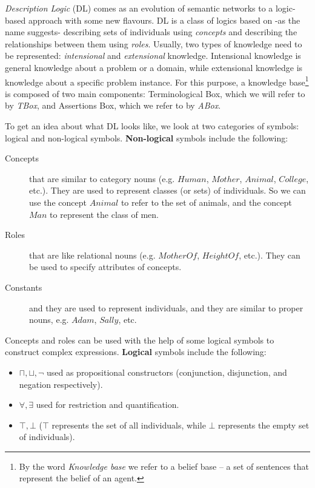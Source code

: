 \textit{Description Logic} (DL) comes as an evolution of semantic networks to a logic-based approach with some new flavours. DL is a class of logics based on -as the name suggests- describing sets of individuals using \textit{concepts} and describing the relationships between them using \textit{roles}. Usually, two types of knowledge need to be represented: \textit{intensional} and \textit{extensional} knowledge. Intensional knowledge is general knowledge about a problem or a domain, while extensional knowledge is knowledge about a specific problem instance. For this purpose, a knowledge base\footnote{By the word \textit{Knowledge base} we refer to a belief base -- a set of sentences that represent the belief of an agent.} is composed of two main components: Terminological Box, which we will refer to by \textit{TBox}, and Assertions Box, which we refer to by \textit{ABox}.

To get an idea about what DL looks like, we look at two categories of symbols: logical and non-logical symbols. \textbf{Non-logical} symbols include the following:
\begin{description}
\item[Concepts] that are similar to category nouns (e.g. $Human$, $Mother$, $Animal$, $College$, etc.). They are used to represent classes (or sets) of individuals. So we can use the concept $Animal$ to refer to the set of animals, and the concept $Man$ to represent the class of men.
\item[Roles] that are like relational nouns (e.g. $MotherOf$, $HeightOf$, etc.). They can be used to specify attributes of concepts.
\item[Constants] and they are used to represent individuals, and they are similar to proper nouns, e.g. $Adam$, $Sally$, etc.
\end{description}

Concepts and roles can be used with the help of some logical symbols to construct complex expressions. \textbf{Logical} symbols include the following:
\begin{itemize}
\item $\sqcap, \sqcup, \neg$ used as propositional constructors (conjunction, disjunction, and negation respectively).
\item $\forall, \exists$ used for restriction and quantification.
\item $\top, \bot$ ($\top$ represents the set of all individuals, while $\bot$ represents the empty set of individuals). 
\end{itemize}

